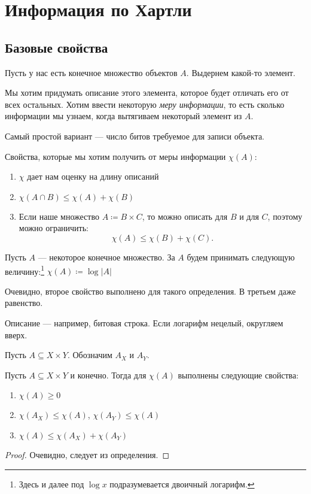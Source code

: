 \chapter{Информация по Хартли}
\section{Базовые свойства}
Пусть у нас есть конечное множество объектов $ A$. Выдернем какой-то элемент.

Мы хотим придумать описание этого элемента, которое будет отличать его от всех остальных. Хотим ввести некоторую \textit{меру информации}, то есть  сколько информации мы узнаем, когда вытягиваем некоторый элемент из $ A$.

Самый простой вариант --- число битов требуемое для записи объекта.

Свойства, которые мы хотим получить от меры информации $ \chi(A)$:
\begin{enumerate}
    \item $ \chi$ дает нам оценку на длину описаний
	\item $ \chi(A \cap B) \le \chi(A) + \chi(B)$
	\item 
Если наше множество $ A \coloneqq  B \times C$, то можно описать для $ B$ и для  $ C$, поэтому можно ограничить:
\[
	\chi(A)  \le \chi(B) + \chi(C)
.\] 
\end{enumerate} 

\begin{defn}
	Пусть $ A$ --- некоторое конечное множество. За   $ A$ будем принимать следующую величину:\footnote{Здесь и далее под $ \log x$ подразумевается двоичный логарифм.}
	$ \chi(A) \coloneqq  \log \lvert A \rvert $
\end{defn}
\begin{note}
Очевидно, второе свойство выполнено для такого определения. В третьем даже равенство. 

Описание --- например, битовая строка. Если логарифм нецелый, округляем вверх.
\end{note}
Пусть $ A  \subseteq X \times Y$. Обозначим  $ A_X$ и $ A_{Y}$.
\begin{figure}[ht]
    \centering
    \label{fig:axy-img}
\end{figure}
\begin{st}
	Пусть $ A \subseteq X\times Y$ и конечно. Тогда для $ \chi(A)$ выполнены следующие свойства:
\begin{enumerate}
	\item $ \chi(A) \ge 0$
	\item $ \chi(A_{X}) \le \chi(A)$, $ \chi(A_{Y}) \le \chi(A)$
	\item $ \chi(A) \le \chi(A_{X}) + \chi(A_{Y})$
\end{enumerate} 
\end{st}
\begin{proof}
    Очевидно, следует из определения.
\end{proof}

